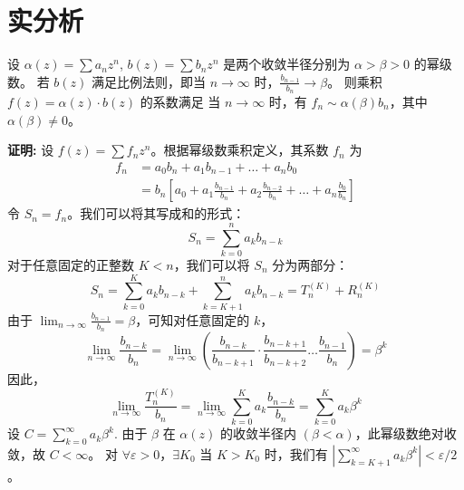 \documentclass[12pt, a4paper]{article}
\begin{document}
\section*{实分析}

\noindent 设 $\alpha(z) = \sum a_n z^n$, $b(z) = \sum b_n z^n$ 是两个收敛半径分别为 $\alpha > \beta > 0$ 的幂级数。
若 $b(z)$ 满足比例法则，即当 $n \to \infty$ 时，$\frac{b_{n-1}}{b_n} \to \beta$。
则乘积 $f(z) = \alpha(z) \cdot b(z)$ 的系数满足
当 $n \to \infty$ 时，有 $f_n \sim \alpha(\beta) b_n$，其中 $\alpha(\beta) \ne 0$。

\noindent \textbf{证明:}
设 $f(z) = \sum f_n z^n$。根据幂级数乘积定义，其系数 $f_n$ 为
\begin{align*}
f_n &= a_0 b_n + a_1 b_{n-1} + \dots + a_n b_0 \\
    &= b_n \left[ a_0 + a_1 \frac{b_{n-1}}{b_n} + a_2 \frac{b_{n-2}}{b_n} + \dots + a_n \frac{b_0}{b_n} \right]
\end{align*}
令 $S_n = f_n$。我们可以将其写成和的形式：
\[ S_n = \sum_{k=0}^n a_k b_{n-k} \]
对于任意固定的正整数 $K < n$，我们可以将 $S_n$ 分为两部分：
\[ S_n = \sum_{k=0}^K a_k b_{n-k} + \sum_{k=K+1}^n a_k b_{n-k} = T_n^{(K)} + R_n^{(K)} \]
由于 $\lim_{n \to \infty} \frac{b_{n-1}}{b_n} = \beta$，可知对任意固定的 $k$，
\[ \lim_{n \to \infty} \frac{b_{n-k}}{b_n} = \lim_{n \to \infty} \left( \frac{b_{n-k}}{b_{n-k+1}} \cdot \frac{b_{n-k+1}}{b_{n-k+2}} \dots \frac{b_{n-1}}{b_n} \right) = \beta^k \]
因此，
\[ \lim_{n \to \infty} \frac{T_n^{(K)}}{b_n} = \lim_{n \to \infty} \sum_{k=0}^K a_k \frac{b_{n-k}}{b_n} = \sum_{k=0}^K a_k \beta^k \]
设 $C = \sum_{k=0}^\infty a_k \beta^k$. 由于 $\beta$ 在 $\alpha(z)$ 的收敛半径内 $(\beta < \alpha)$，此幂级数绝对收敛，故 $C < \infty$。
对 $\forall \varepsilon > 0$，$\exists K_0$ 当 $K > K_0$ 时，我们有 $\left| \sum_{k=K+1}^\infty a_k \beta^k \right| < \varepsilon/2$。
\end{document}
